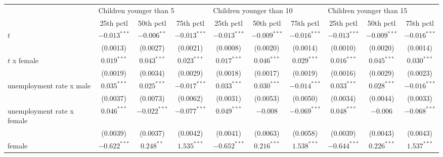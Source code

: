 \begin{tabular}{l|ccc|ccc|ccc|}
\toprule
{} & \multicolumn{3}{l}{Children younger than 5} & \multicolumn{3}{l}{Children younger than 10} & \multicolumn{3}{l}{Children younger than 15} \\
{} &               25th pctl &       50th pctl &       75th pctl &                25th pctl &       50th pctl &       75th pctl &                25th pctl &       50th pctl &       75th pctl \\
\midrule
$t$                        &          $-0.013^{***}$ &   $-0.006^{**}$ &  $-0.013^{***}$ &           $-0.013^{***}$ &  $-0.009^{***}$ &  $-0.016^{***}$ &           $-0.013^{***}$ &  $-0.009^{***}$ &  $-0.016^{***}$ \\
                           &                (0.0013) &        (0.0027) &        (0.0021) &                 (0.0008) &        (0.0020) &        (0.0014) &                 (0.0010) &        (0.0020) &        (0.0014) \\
$t$ x female               &           $0.019^{***}$ &   $0.043^{***}$ &   $0.023^{***}$ &            $0.017^{***}$ &   $0.046^{***}$ &   $0.029^{***}$ &            $0.016^{***}$ &   $0.045^{***}$ &   $0.030^{***}$ \\
                           &                (0.0019) &        (0.0034) &        (0.0029) &                 (0.0018) &        (0.0017) &        (0.0019) &                 (0.0016) &        (0.0029) &        (0.0023) \\
unemployment rate x male   &           $0.035^{***}$ &   $0.025^{***}$ &  $-0.017^{***}$ &            $0.033^{***}$ &   $0.030^{***}$ &  $-0.014^{***}$ &            $0.033^{***}$ &   $0.028^{***}$ &  $-0.016^{***}$ \\
                           &                (0.0037) &        (0.0073) &        (0.0062) &                 (0.0031) &        (0.0053) &        (0.0050) &                 (0.0034) &        (0.0044) &        (0.0033) \\
unemployment rate x female &           $0.046^{***}$ &  $-0.022^{***}$ &  $-0.077^{***}$ &            $0.049^{***}$ &        $-0.008$ &  $-0.069^{***}$ &            $0.048^{***}$ &        $-0.006$ &  $-0.068^{***}$ \\
                           &                (0.0039) &        (0.0037) &        (0.0042) &                 (0.0041) &        (0.0063) &        (0.0058) &                 (0.0039) &        (0.0043) &        (0.0043) \\
female                     &          $-0.622^{***}$ &    $0.248^{**}$ &   $1.535^{***}$ &           $-0.652^{***}$ &   $0.216^{***}$ &   $1.538^{***}$ &           $-0.644^{***}$ &   $0.226^{***}$ &   $1.537^{***}$ \\

\end{tabular}
